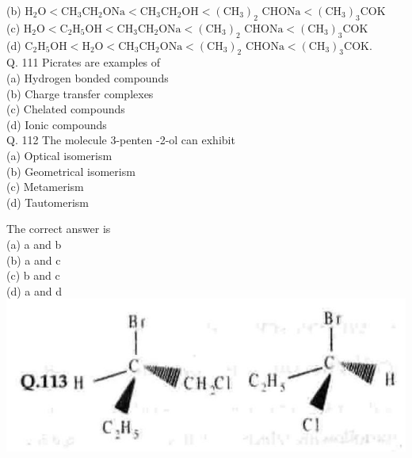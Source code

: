 \documentclass[10pt]{article}
\begin{document}
(b) $\mathrm{H}_{2} \mathrm{O}<\mathrm{CH}_{3} \mathrm{CH}_{2} \mathrm{ONa}<\mathrm{CH}_{3} \mathrm{CH}_{2} \mathrm{OH}<\left(\mathrm{CH}_{3}\right)_{2}$ $\mathrm{CHONa}<\left(\mathrm{CH}_{3}\right)_{3} \mathrm{COK}$\\
(c) $\mathrm{H}_{2} \mathrm{O}<\mathrm{C}_{2} \mathrm{H}_{5} \mathrm{OH}<\mathrm{CH}_{3} \mathrm{CH}_{2} \mathrm{ONa}<\left(\mathrm{CH}_{3}\right)_{2}$ $\mathrm{CHONa}<\left(\mathrm{CH}_{3}\right)_{3} \mathrm{COK}$\\
(d) $\mathrm{C}_{2} \mathrm{H}_{5} \mathrm{OH}<\mathrm{H}_{2} \mathrm{O}<\mathrm{CH}_{3} \mathrm{CH}_{2} \mathrm{ONa}<\left(\mathrm{CH}_{3}\right)_{2}$ $\mathrm{CHONa}<\left(\mathrm{CH}_{3}\right)_{3} \mathrm{COK}$.\\
Q. 111 Picrates are examples of\\
(a) Hydrogen bonded compounds\\
(b) Charge transfer complexes\\
(c) Chelated compounds\\
(d) Ionic compounds\\
Q. 112 The molecule 3-penten -2-ol can exhibit\\
(a) Optical isomerism\\
(b) Geometrical isomerism\\
(c) Metamerism\\
(d) Tautomerism

The correct answer is\\
(a) a and b\\
(b) a and c\\
(c) b and c\\
(d) a and d\\
\includegraphics[max width=\textwidth, center]{2025_01_28_8470952b98110cec3aabg-141}
\end{document}
